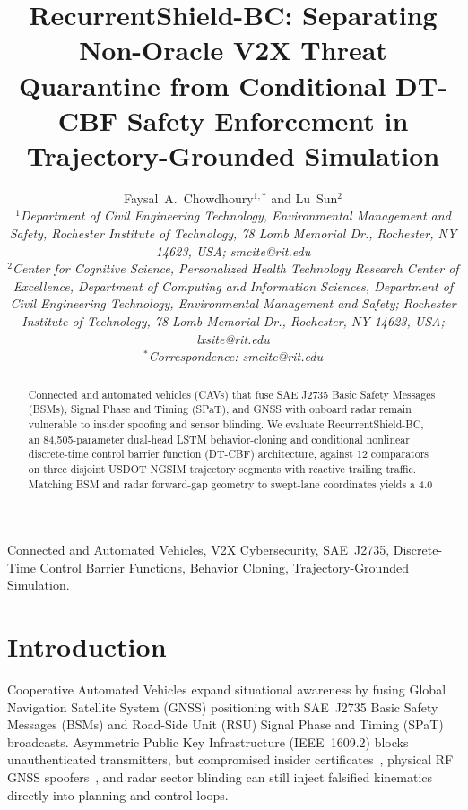 \documentclass[journal]{IEEEtran}
\title{RecurrentShield-BC: Separating Non-Oracle V2X Threat Quarantine from Conditional DT-CBF Safety Enforcement in Trajectory-Grounded Simulation}
\author{Faysal~A.~Chowdhoury$^{1,*}$ and Lu~Sun$^{2}$\\[0.4em]
{\small\itshape $^{1}$Department of Civil Engineering Technology, Environmental Management and Safety, Rochester Institute of Technology, 78 Lomb Memorial Dr., Rochester, NY 14623, USA; smcite@rit.edu\\
$^{2}$Center for Cognitive Science, Personalized Health Technology Research Center of Excellence, Department of Computing and Information Sciences, Department of Civil Engineering Technology, Environmental Management and Safety; Rochester Institute of Technology, 78 Lomb Memorial Dr., Rochester, NY 14623, USA; lxsite@rit.edu\\
$^{*}$Correspondence: smcite@rit.edu}}
\begin{document}
\maketitle

\begin{abstract}
Connected and automated vehicles (CAVs) that fuse SAE J2735 Basic Safety Messages (BSMs), Signal Phase and Timing (SPaT), and GNSS with onboard radar remain vulnerable to insider spoofing and sensor blinding. We evaluate RecurrentShield-BC, an 84,505-parameter dual-head LSTM behavior-cloning and conditional nonlinear discrete-time control barrier function (DT-CBF) architecture, against 12 comparators on three disjoint USDOT NGSIM trajectory segments with reactive trailing traffic. Matching BSM and radar forward-gap geometry to swept-lane coordinates yields a 4.0%
\end{abstract}

\begin{IEEEkeywords}
Connected and Automated Vehicles, V2X Cybersecurity, SAE~J2735, Discrete-Time Control Barrier Functions, Behavior Cloning, Trajectory-Grounded Simulation.
\end{IEEEkeywords}

\section{Introduction}
Cooperative Automated Vehicles expand situational awareness by fusing Global Navigation Satellite System (GNSS) positioning with SAE~J2735 Basic Safety Messages (BSMs) and Road-Side Unit (RSU) Signal Phase and Timing (SPaT) broadcasts. Asymmetric Public Key Infrastructure (IEEE~1609.2) blocks unauthenticated transmitters, but compromised insider certificates~\cite{vanderheijden2019,kamel2020veremi}, physical RF GNSS spoofers~\cite{shen2020drift}, and radar sector blinding can still inject falsified kinematics directly into planning and control loops.
\end{document}
